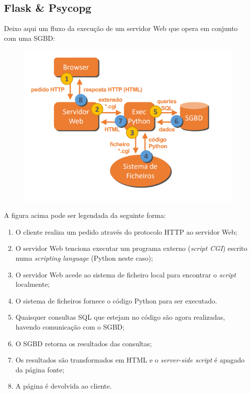 \documentclass[oneside]{book}
\theoremstyle{definition}
\begin{document}
\subsection{Flask \& Psycopg}
Deixo aqui um fluxo da execução de um servidor Web que opera em conjunto com uma SGBD:
\begin{figure}[H]
    \centering
    \includegraphics[scale = 0.5]{cap_web/server_web_sgbd.png}
\end{figure}
A figura acima pode ser legendada da seguinte forma:
\begin{enumerate}
    \itemsep0cm
    \item O cliente realiza um pedido através do protocolo HTTP ao servidor Web;
    \item O servidor Web tenciona executar um programa externo (\textit{script CGI}) escrito numa \textit{scripting language} (Python neste caso);
    \item O servidor Web acede ao sistema de ficheiro local para encontrar o \textit{script} localmente;
    \item O sistema de ficheiros fornece o código Python para ser executado.
    \item Quaisquer consultas SQL que estejam no código são agora realizadas, havendo comunicação com o SGBD;
    \item O SGBD retorna os resultados das consultas;
    \item Os resultados são transformados em HTML e o \textit{server-side script} é apagado da página fonte;
    \item A página é devolvida ao cliente.
\end{enumerate}
\end{document}

